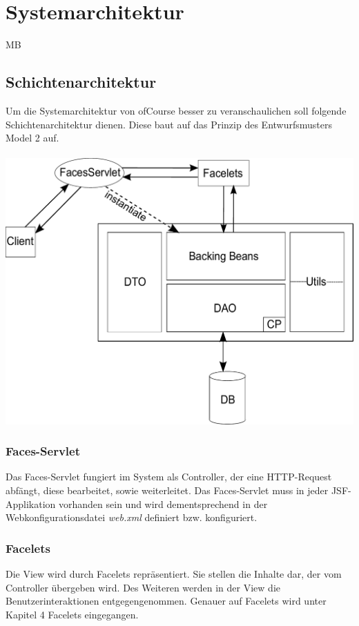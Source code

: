 \chapter{Systemarchitektur}
\begin{tiny}
MB
\end{tiny}
\section{Schichtenarchitektur}
	Um die Systemarchitektur von \glqq ofCourse\grqq{} besser zu veranschaulichen soll folgende Schichtenarchitektur dienen. Diese baut auf das Prinzip des Entwurfsmusters \glqq Model 2\grqq{} auf. \\ \\
    \includegraphics[scale=0.50]{Grafiken/Schichtenarchitektur.pdf}
	\subsection{Faces-Servlet}
	    Das Faces-Servlet fungiert im System als Controller, der eine HTTP-Request abfängt, diese bearbeitet, sowie weiterleitet. Das Faces-Servlet muss in jeder JSF-Applikation vorhanden sein und wird dementsprechend in der Webkonfigurationsdatei \textit{web.xml} definiert bzw. konfiguriert. 
    \subsection{Facelets}
    	Die View wird durch Facelets repräsentiert. Sie stellen die Inhalte dar, der vom Controller übergeben wird. Des Weiteren werden in der View die Benutzerinteraktionen entgegengenommen. Genauer auf Facelets wird unter Kapitel 4 Facelets eingegangen.
